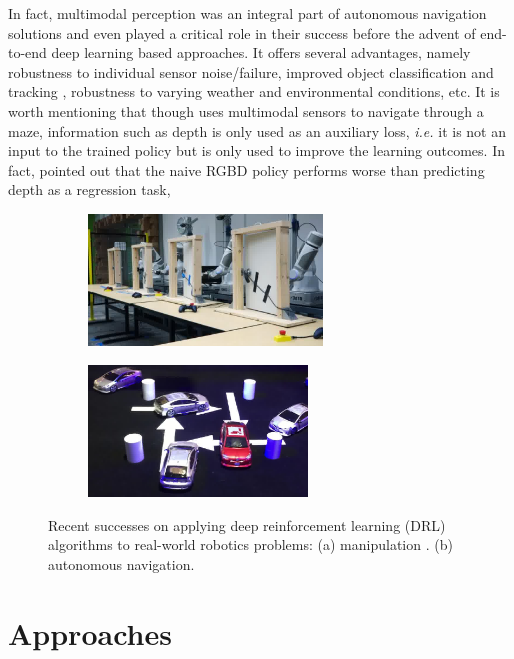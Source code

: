 \documentclass[../thesis.tex]{subfiles}
\begin{document}
In fact, multimodal perception was an integral part of autonomous navigation solutions and even played a critical role in their success \cite{multimodaltartan} before the advent of end-to-end deep learning based approaches. 
It offers several advantages, namely robustness to individual sensor noise/failure, improved object classification and tracking \cite{elfring2016multisensor, cho2014multi, darms2008classification}, robustness to varying weather and environmental conditions, etc. 
It is worth mentioning that though \citet{mirowski2017a} uses multimodal sensors to navigate through a maze, information such as depth is only used as an auxiliary loss, \textit{i.e.} it is not an input to the trained policy but is only used to improve the learning outcomes. 
In fact, \citet{mirowski2017a} pointed out that the naive RGBD policy performs worse than predicting depth as a regression task,


\begin{figure}[b]
	\vskip -0.1in
    \centering
    \begin{subfigure}[b]{0.45\linewidth}
        \includegraphics[height=3.5cm]{./Introduction/fig/drl_manipulation.jpg}
    \end{subfigure}
    \begin{subfigure}[b]{0.45\linewidth}
        \includegraphics[height=3.5cm]{./Introduction/fig/drl_perfer_network.jpg}
    \end{subfigure}
    \caption{Recent successes on applying deep reinforcement learning (DRL) algorithms to real-world robotics problems: (a) manipulation \cite{gu2016deep}. (b) autonomous navigation. \cite{prefernetwork}}
    \label{fig:end-to-end}
\end{figure}


\section{Approaches}
\end{document}
